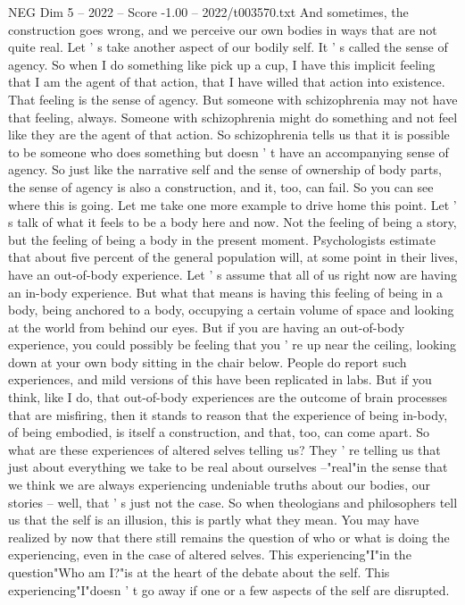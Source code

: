 \begin{textsample}{NEG Dim 5 – 2022 – Score -1.00 – 2022/t003570.txt}
And sometimes, the construction goes wrong, and we perceive our own bodies in ways that are not quite real.
Let ' s take another aspect of our bodily self.
It ' s called the sense of agency.
So when I do something like pick up a cup, I have this implicit feeling that I am the agent of that action, that I have willed that action into existence.
That feeling is the sense of agency.
But someone with schizophrenia may not have that feeling, always.
Someone with schizophrenia might do something and not feel like they are the agent of that action.
So schizophrenia tells us that it is possible to be someone who does something but doesn ' t have an accompanying sense of agency.
So just like the narrative self and the sense of ownership of body parts, the sense of agency is also a construction, and it, too, can fail.
So you can see where this is going.
Let me take one more example to drive home this point.
Let ' s talk of what it feels to be a body here and now.
Not the feeling of being a story, but the feeling of being a body in the present moment.
Psychologists estimate that about five percent of the general population will, at some point in their lives, have an out-of-body experience.
Let ' s assume that all of us right now are having an in-body experience.
But what that means is having this feeling of being in a body, being anchored to a body, occupying a certain volume of space and looking at the world from behind our eyes.
But if you are having an out-of-body experience, you could possibly be feeling that you ' re up near the ceiling, looking down at your own body sitting in the chair below.
People do report such experiences, and mild versions of this have been replicated in labs.
But if you think, like I do, that out-of-body experiences are the outcome of brain processes that are misfiring, then it stands to reason that the experience of being in-body, of being embodied, is itself a construction, and that, too, can come apart.
So what are these experiences of altered selves telling us?
They ' re telling us that just about everything we take to be real about ourselves --"real"in the sense that we think we are always experiencing undeniable truths about our bodies, our stories -- well, that ' s just not the case.
So when theologians and philosophers tell us that the self is an illusion, this is partly what they mean.
You may have realized by now that there still remains the question of who or what is doing the experiencing, even in the case of altered selves.
This experiencing"I"in the question"Who am I?"is at the heart of the debate about the self.
This experiencing"I"doesn ' t go away if one or a few aspects of the self are disrupted.

\end{textsample}
